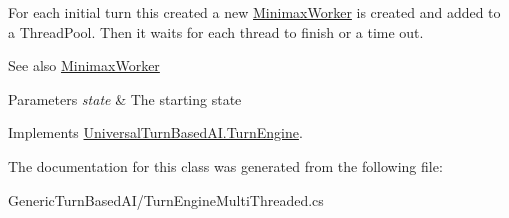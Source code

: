 For each initial turn this created a new \hyperlink{class_universal_turn_based_a_i_1_1_minimax_worker}{Minimax\+Worker} is created and added to a Thread\+Pool. Then it waits for each thread to finish or a time out. \begin{DoxySeeAlso}{See also}
\hyperlink{class_universal_turn_based_a_i_1_1_minimax_worker}{Minimax\+Worker}


\end{DoxySeeAlso}



\begin{DoxyParams}{Parameters}
{\em state} & The starting state\\
\hline
\end{DoxyParams}


Implements \hyperlink{class_universal_turn_based_a_i_1_1_turn_engine}{Universal\+Turn\+Based\+A\+I.\+Turn\+Engine}.



The documentation for this class was generated from the following file\+:\begin{DoxyCompactItemize}
\item 
Generic\+Turn\+Based\+A\+I/Turn\+Engine\+Multi\+Threaded.\+cs\end{DoxyCompactItemize}
